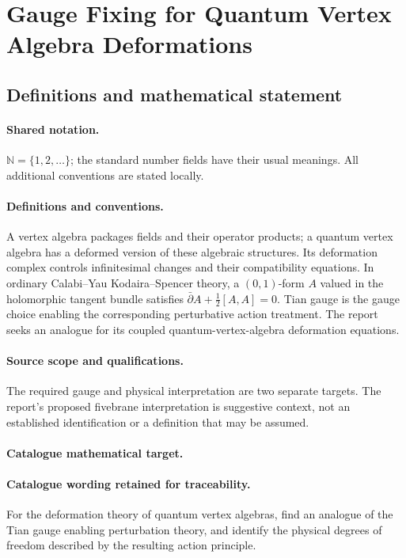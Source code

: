 \documentclass[11pt]{article}
\begin{document}
\section{Gauge Fixing for Quantum Vertex Algebra Deformations}\label{statement}

\subsection{Definitions and mathematical statement}

\paragraph{Shared notation.}$\mathbb N=\{1,2,\ldots\}$; the standard number fields have their usual meanings. All additional conventions are stated locally.


\paragraph{Definitions and conventions.} A vertex algebra packages fields and their operator products; a quantum vertex algebra has a deformed version of these algebraic structures. Its deformation complex controls infinitesimal changes and their compatibility equations. In ordinary Calabi--Yau Kodaira--Spencer theory, a $(0,1)$-form $A$ valued in the holomorphic tangent bundle satisfies $\bar\partial A+\tfrac12[A,A]=0$. Tian gauge is the gauge choice enabling the corresponding perturbative action treatment. The report seeks an analogue for its coupled quantum-vertex-algebra deformation equations.

\paragraph{Source scope and qualifications.} The required gauge and physical interpretation are two separate targets. The report's proposed fivebrane interpretation is suggestive context, not an established identification or a definition that may be assumed.

\paragraph{Catalogue mathematical target.}
\paragraph{Catalogue wording retained for traceability.}
For the deformation theory of quantum vertex algebras, find an analogue of the Tian gauge enabling perturbation theory, and identify the physical degrees of freedom described by the resulting action principle.
\end{document}
